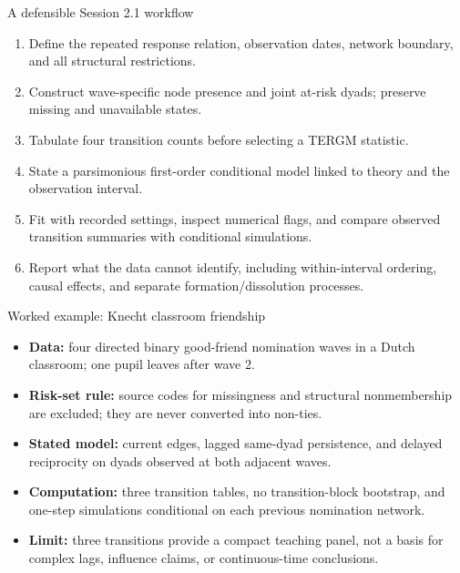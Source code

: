 \documentclass[aspectratio=169,11pt]{beamer}
\newcommand{\term}[1]{\textbf{\color{nupurple}#1}}
\begin{document}
\begin{frame}{A defensible Session 2.1 workflow}
\begin{enumerate}
\item Define the repeated response relation, observation dates, network boundary, and all structural restrictions.
\item Construct wave-specific node presence and joint at-risk dyads; preserve missing and unavailable states.
\item Tabulate four transition counts before selecting a TERGM statistic.
\item State a parsimonious first-order conditional model linked to theory and the observation interval.
\item Fit with recorded settings, inspect numerical flags, and compare observed transition summaries with conditional simulations.
\item Report what the data cannot identify, including within-interval ordering, causal effects, and separate formation/dissolution processes.
\end{enumerate}
\end{frame}

\begin{frame}{Worked example: Knecht classroom friendship}
\begin{itemize}
\item \term{Data:} four directed binary good-friend nomination waves in a Dutch classroom; one pupil leaves after wave 2.
\item \term{Risk-set rule:} source codes for missingness and structural nonmembership are excluded; they are never converted into non-ties.
\item \term{Stated model:} current edges, lagged same-dyad persistence, and delayed reciprocity on dyads observed at both adjacent waves.
\item \term{Computation:} three transition tables, no transition-block bootstrap, and one-step simulations conditional on each previous nomination network.
\item \term{Limit:} three transitions provide a compact teaching panel, not a basis for complex lags, influence claims, or continuous-time conclusions.
\end{itemize}
\end{frame}
\end{document}
